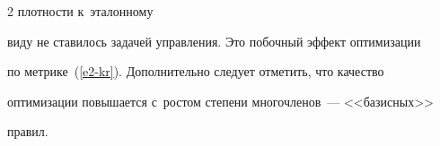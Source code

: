 \begin{multicols}{2}
 плотности к~эталонному 


виду не ставилось задачей управ\-ле\-ния. Это побочный эффект оптимизации 


по мет\-ри\-ке~(\ref{e2-kr}). Дополнительно следует отметить, что качество 


оптимизации повышается с~рос\-том степени многочленов~--- <<базисных>> 


правил. %





\pagebreak





\end{multicols}





